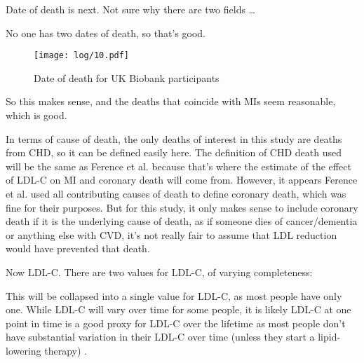 \documentclass[11pt]{article}
\begin{document}
Date of death is next. Not sure why there are two fields \ldots

\color{Blue4}
\begin{stlog}\end{stlog}
\color{black}

No one has two dates of death, so that's good. 

\color{Blue4}
\begin{figure}
    \centering
    \texttt{[image: log/10.pdf]}
    \caption{Date of death for UK Biobank participants}
    \label{dodhist}
\end{figure}
\begin{stlog}\end{stlog}
\color{black}

So this makes sense, and the deaths that coincide with MIs seem reasonable, which is good. 


In terms of cause of death, the only deaths of interest in this study are deaths from CHD,
so it can be defined easily here.
The definition of CHD death used will be the same as Ference et al. \cite{FerenceJAMA2019}
because that's where the estimate of the effect of LDL-C on MI and coronary death will come from. 
However, it appears Ference et al. used all contributing causes of death to define coronary death, which was fine for 
their purposes. But for this study, it only makes sense to include coronary death if
it is the underlying cause of death, as if someone dies of cancer/dementia or anything
else with CVD, it's not really fair to assume that LDL reduction would have prevented
that death. 

\color{Blue4}
\begin{stlog}\end{stlog}
\color{black}

Now LDL-C. There are two values for LDL-C, of varying completeness:

\color{Blue4}
\begin{stlog}\end{stlog}
\color{black}

This will be collapsed into a single value for LDL-C, as most people have only one. 
While LDL-C will vary over time for some people, it is likely LDL-C at one 
point in time is a good proxy for LDL-C over the lifetime as most people don't 
have substantial variation in their LDL-C over time 
(unless they start a lipid-lowering therapy) \cite{DuncanJAHA2019}. 
\end{document}
